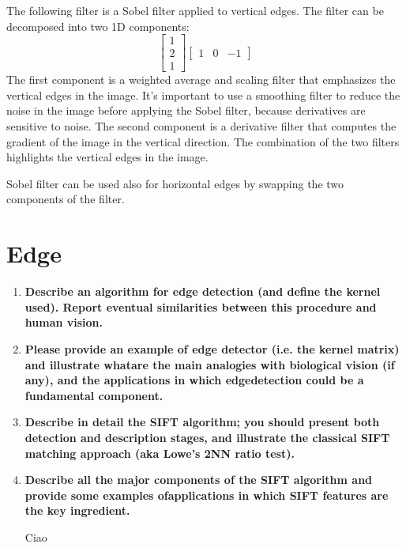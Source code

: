 \documentclass[12pt]{article}
\begin{document}
\begin{enumerate}
    The following filter is a Sobel filter applied to vertical edges. The filter can be decomposed into two 1D components:
    \[
    \begin{bmatrix}
    1 \\
    2 \\
    1
    \end{bmatrix}
    \begin{bmatrix}
    1 & 0 & -1
    \end{bmatrix}
    \]
    The first component is a weighted average and scaling filter that emphasizes the vertical edges in the image.
    It's important to use a smoothing filter to reduce the noise in the image before applying the Sobel filter, because derivatives are sensitive to noise.
    The second component is a derivative filter that computes the gradient of the image in the vertical direction. 
    The combination of the two filters highlights the vertical edges in the image.

    Sobel filter can be used also for horizontal edges by swapping the two components of the filter.
\end{enumerate}

\section{Edge}

\begin{enumerate}
    \item \textbf{Describe an algorithm for edge detection (and define the kernel used). Report eventual similarities between this procedure and human vision.}
    
    \item \textbf{Please provide an example of edge detector (i.e. the kernel matrix) and illustrate whatare the main analogies with biological vision (if any), 
    and the applications in which edgedetection could be a fundamental component.}

    \item \textbf{Describe in detail the SIFT algorithm; you should present both detection and description stages, 
    and illustrate the classical SIFT matching approach (aka Lowe’s 2NN ratio test).}

    \item \textbf{Describe all the major components of the SIFT algorithm and provide some examples ofapplications in which SIFT features are the key ingredient.}

    Ciao

\end{enumerate}
\end{document}
